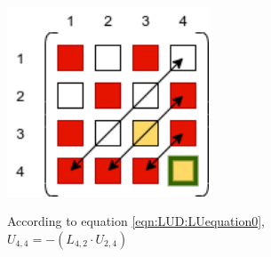 \begin{minipage}{0.45\textwidth}
\includegraphics[width=0.45\textwidth]{./Scheduler/PpT-Symbolic_A33.png}
\end{minipage}%
\hfill
\begin{minipage}{0.85\textwidth}
According to equation \ref{eqn:LUD:LUequation0},\\
$U_{4,4}= - (L_{4,2}\cdot U_{2,4} )$
\end{minipage}